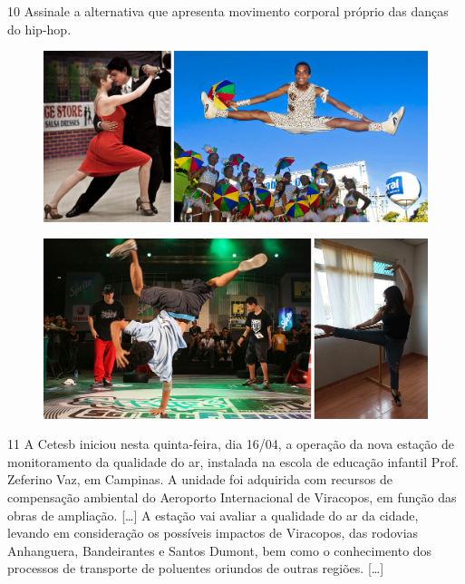 \pagebreak
\num{10} Assinale a alternativa que apresenta movimento corporal próprio das danças do hip-hop.

\begin{figure}[htpb!]
\includegraphics[width=.7\textwidth]{./imgs/art35ab.png}
\end{figure}

\begin{figure}[htpb!]
\includegraphics[width=.7\textwidth]{./imgs/art35cd.png}
\end{figure}




%
%

\enlargethispage{3\baselineskip}
\num{11} A Cetesb iniciou nesta quinta-feira, dia 16/04, a operação da nova
estação de monitoramento da qualidade do ar, instalada na escola de
educação infantil Prof. Zeferino Vaz, em Campinas. A unidade foi
adquirida com recursos de compensação ambiental do Aeroporto
Internacional de Viracopos, em função das obras de ampliação. {[}\ldots{}{]} A estação
vai avaliar a qualidade do ar da cidade, levando em consideração os
possíveis impactos de Viracopos, das rodovias Anhanguera, Bandeirantes e
Santos Dumont, bem como o conhecimento dos processos de transporte de
poluentes oriundos de outras regiões. {[}\ldots{}{]}

